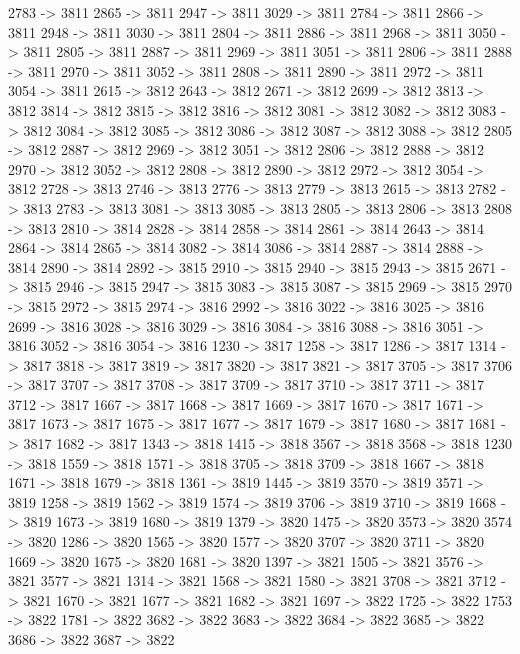 {	2783 -> 3811
	2865 -> 3811
	2947 -> 3811
	3029 -> 3811
	2784 -> 3811
	2866 -> 3811
	2948 -> 3811
	3030 -> 3811
	2804 -> 3811
	2886 -> 3811
	2968 -> 3811
	3050 -> 3811
	2805 -> 3811
	2887 -> 3811
	2969 -> 3811
	3051 -> 3811
	2806 -> 3811
	2888 -> 3811
	2970 -> 3811
	3052 -> 3811
	2808 -> 3811
	2890 -> 3811
	2972 -> 3811
	3054 -> 3811
	2615 -> 3812
	2643 -> 3812
	2671 -> 3812
	2699 -> 3812
	3813 -> 3812
	3814 -> 3812
	3815 -> 3812
	3816 -> 3812
	3081 -> 3812
	3082 -> 3812
	3083 -> 3812
	3084 -> 3812
	3085 -> 3812
	3086 -> 3812
	3087 -> 3812
	3088 -> 3812
	2805 -> 3812
	2887 -> 3812
	2969 -> 3812
	3051 -> 3812
	2806 -> 3812
	2888 -> 3812
	2970 -> 3812
	3052 -> 3812
	2808 -> 3812
	2890 -> 3812
	2972 -> 3812
	3054 -> 3812
	2728 -> 3813
	2746 -> 3813
	2776 -> 3813
	2779 -> 3813
	2615 -> 3813
	2782 -> 3813
	2783 -> 3813
	3081 -> 3813
	3085 -> 3813
	2805 -> 3813
	2806 -> 3813
	2808 -> 3813
	2810 -> 3814
	2828 -> 3814
	2858 -> 3814
	2861 -> 3814
	2643 -> 3814
	2864 -> 3814
	2865 -> 3814
	3082 -> 3814
	3086 -> 3814
	2887 -> 3814
	2888 -> 3814
	2890 -> 3814
	2892 -> 3815
	2910 -> 3815
	2940 -> 3815
	2943 -> 3815
	2671 -> 3815
	2946 -> 3815
	2947 -> 3815
	3083 -> 3815
	3087 -> 3815
	2969 -> 3815
	2970 -> 3815
	2972 -> 3815
	2974 -> 3816
	2992 -> 3816
	3022 -> 3816
	3025 -> 3816
	2699 -> 3816
	3028 -> 3816
	3029 -> 3816
	3084 -> 3816
	3088 -> 3816
	3051 -> 3816
	3052 -> 3816
	3054 -> 3816
	1230 -> 3817
	1258 -> 3817
	1286 -> 3817
	1314 -> 3817
	3818 -> 3817
	3819 -> 3817
	3820 -> 3817
	3821 -> 3817
	3705 -> 3817
	3706 -> 3817
	3707 -> 3817
	3708 -> 3817
	3709 -> 3817
	3710 -> 3817
	3711 -> 3817
	3712 -> 3817
	1667 -> 3817
	1668 -> 3817
	1669 -> 3817
	1670 -> 3817
	1671 -> 3817
	1673 -> 3817
	1675 -> 3817
	1677 -> 3817
	1679 -> 3817
	1680 -> 3817
	1681 -> 3817
	1682 -> 3817
	1343 -> 3818
	1415 -> 3818
	3567 -> 3818
	3568 -> 3818
	1230 -> 3818
	1559 -> 3818
	1571 -> 3818
	3705 -> 3818
	3709 -> 3818
	1667 -> 3818
	1671 -> 3818
	1679 -> 3818
	1361 -> 3819
	1445 -> 3819
	3570 -> 3819
	3571 -> 3819
	1258 -> 3819
	1562 -> 3819
	1574 -> 3819
	3706 -> 3819
	3710 -> 3819
	1668 -> 3819
	1673 -> 3819
	1680 -> 3819
	1379 -> 3820
	1475 -> 3820
	3573 -> 3820
	3574 -> 3820
	1286 -> 3820
	1565 -> 3820
	1577 -> 3820
	3707 -> 3820
	3711 -> 3820
	1669 -> 3820
	1675 -> 3820
	1681 -> 3820
	1397 -> 3821
	1505 -> 3821
	3576 -> 3821
	3577 -> 3821
	1314 -> 3821
	1568 -> 3821
	1580 -> 3821
	3708 -> 3821
	3712 -> 3821
	1670 -> 3821
	1677 -> 3821
	1682 -> 3821
	1697 -> 3822
	1725 -> 3822
	1753 -> 3822
	1781 -> 3822
	3682 -> 3822
	3683 -> 3822
	3684 -> 3822
	3685 -> 3822
	3686 -> 3822
	3687 -> 3822
}
